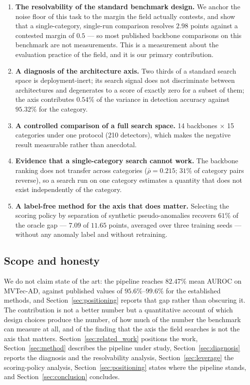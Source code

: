 \begin{enumerate}
  \item \textbf{The resolvability of the standard benchmark design.} We anchor the
  noise floor of this task to the margin the field actually contests, and show
  that a single-category, single-run comparison resolves $2.98$ points against a
  contested margin of $0.5$ --- so most published backbone comparisons on this
  benchmark are not measurements. This is a measurement about the evaluation
  practice of the field, and it is our primary contribution.
  \item \textbf{A diagnosis of the architecture axis.} Two thirds of a standard
  search space is deployment-inert; its search signal does not discriminate
  between architectures and degenerates to a score of exactly zero for a subset of
  them; the axis contributes $0.54\%$ of the variance in detection accuracy
  against $95.32\%$ for the category.
  \item \textbf{A controlled comparison of a full search space.} 14 backbones
  $\times$ 15 categories under one protocol (210 detectors), which makes the
  negative result measurable rather than anecdotal.
  \item \textbf{Evidence that a single-category search cannot work.} The backbone
  ranking does not transfer across categories ($\bar\rho = 0.215$; $31\%$ of
  category pairs reverse), so a search run on one category estimates a quantity
  that does not exist independently of the category.
  \item \textbf{A label-free method for the axis that does matter.} Selecting the
  scoring policy by separation of synthetic pseudo-anomalies recovers $61\%$ of the
  oracle gap --- $7.09$ of $11.65$ points, averaged over three training seeds ---
  without any anomaly label and without retraining.
\end{enumerate}

\subsection*{Scope and honesty}

We do not claim state of the art: the pipeline reaches $82.47\%$ mean AUROC on
MVTec-AD, against published values of $95.6\%$--$99.6\%$ for the established
methods, and Section~\ref{sec:positioning} reports that gap rather than obscuring
it. The contribution is not a better number but a quantitative account of which
design choices produce the number, of how much of the number the benchmark can
measure at all, and of the finding that the axis the field searches is not the
axis that matters. Section~\ref{sec:related_work} positions the work,
Section~\ref{sec:method} describes the pipeline under study,
Section~\ref{sec:diagnosis} reports the diagnosis and the resolvability analysis,
Section~\ref{sec:leverage} the scoring-policy analysis,
Section~\ref{sec:positioning} states where the pipeline stands, and
Section~\ref{sec:conclusion} concludes.
